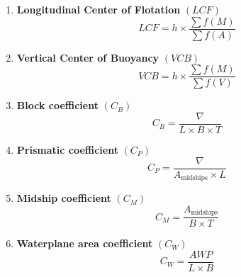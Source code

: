 \documentclass[12pt,a4paper,twoside]{report}
\begin{document}
\begin{enumerate}[\alph*)]
\item \textbf{Longitudinal Center of Flotation} $(LCF)$
\begin{equation}
LCF =
h \times
\frac{\sum f(M)}{\sum f(A)}
\end{equation}

\item \textbf{Vertical Center of Buoyancy} $(VCB)$
\begin{equation}
VCB =
h \times
\frac{\sum f(M)}{\sum f(V)}
\end{equation}

\item \textbf{Block coefficient} $(C_B)$
\begin{equation}
C_B =
\frac{\nabla}{L \times B \times T}
\end{equation}

\item \textbf{Prismatic coefficient} $(C_P)$
\begin{equation}
C_P =
\frac{\nabla}{A_{\text{midships}} \times L}
\end{equation}

\item \textbf{Midship coefficient} $(C_M)$
\begin{equation}
C_M =
\frac{A_{\text{midships}}}{B \times T}
\end{equation}

\item \textbf{Waterplane area coefficient} $(C_W)$
\begin{equation}
C_W =
\frac{AWP}{L \times B}
\end{equation}

\end{enumerate}
\end{document}
